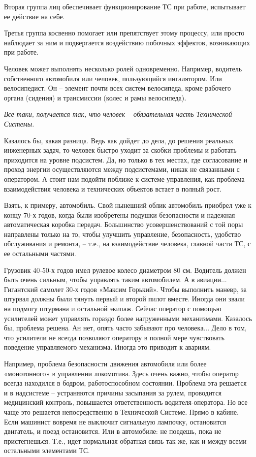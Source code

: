 \documentclass[11pt,a4paper]{article}
\begin{document}
Вторая группа лиц обеспечивает функционирование ТС при работе, испытывает ее
действие на себе.

Третья группа косвенно помогает или препятствует этому процессу, или просто
наблюдает за ним и подвергается воздействию побочных эффектов, возникающих при
работе.


Человек может выполнять несколько ролей одновременно. Например, водитель
собственного автомобиля или человек, пользующийся ингалятором. Или
велосипедист. Он – элемент почти всех систем велосипеда, кроме рабочего органа
(сидения) и трансмиссии (колес и рамы велосипеда).


\emph{Все-таки, получается так, что человек – обязательная часть Технической
Системы.}

Казалось бы, какая разница. Ведь как дойдет до дела, до решения реальных
инженерных задач, то человек быстро уходит за скобки проблемы и работать
приходится на уровне подсистем. Да, но только в тех местах, где согласование и
проход энергии осуществляются между подсистемами, никак не связанными с
оператором. А стоит нам подойти поближе к системе управления, как проблема
взаимодействия человека и технических объектов встает в полный рост.

Взять, к примеру, автомобиль. Свой нынешний облик автомобиль приобрел уже к
концу 70-х годов, когда были изобретены подушки безопасности и надежная
автоматическая коробка передач. Большинство усовершенствований с той поры
направлены только на то, чтобы улучшить управление, безопасность, удобство
обслуживания и ремонта, – т.е., на взаимодействие человека, главной части ТС,
с ее остальными частями.

Грузовик 40-50-х годов имел рулевое колесо диаметром 80 см. Водитель должен
быть очень сильным, чтобы управлять таким автомобилем. А в авиации...
Гигантский самолет 30-х годов «Максим Горький». Чтобы выполнить маневр, за
штурвал должны были тянуть первый и второй пилот вместе. Иногда они звали на
подмогу штурмана и остальной экипаж. Сейчас оператор с помощью усилителей
может управлять гораздо более нагруженными механизмами. Казалось бы, проблема
решена. Ан нет, опять часто забывают про человека... Дело в том, что усилители
не всегда позволяют оператору в полной мере чувствовать поведение управляемого
механизма. Иногда это приводит к авариям.


Например, проблема безопасности движения автомобиля или более «монотонного» в
управлении локомотива. Здесь очень важно, чтобы оператор всегда находился в
бодром, работоспособном состоянии. Проблема эта решается и в надсистеме –
устраняются причины засыпания за рулем, проводится медицинский контроль,
повышается ответственность водителя-оператора. Но все чаще это решается
непосредственно в Технической Системе. Прямо в кабине. Если машинист вовремя
не выключит сигнальную лампочку, остановится двигатель, и поезд
остановится. Или в автомобиле: не поедешь, пока не пристегнешься. Т.е., идет
нормальная обратная связь так же, как и между всеми остальными элементами ТС.
\end{document}

